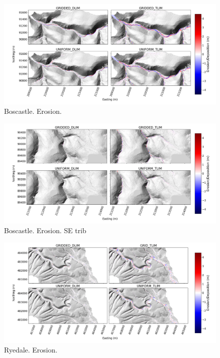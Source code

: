 %
%

\begin{figure}
\includegraphics[width=25cm]{chp06_figures_scripts/figure_boscastle_erosion_diff_ensemble.png}
\caption{Boscastle. Erosion.}
\label{fig_boscastle_2dplan_erosion_ensemble}
\end{figure}

\begin{figure}
\includegraphics[width=18cm]{chp06_figures_scripts/figure_boscastle_erosion_diff_ensemble_SE.png}
\caption{Boscastle. Erosion. SE trib}
\label{fig_boscastle_2dplan_erosion_ensemble_SE}
\end{figure}

\begin{figure}
\includegraphics[width=25cm]{chp06_figures_scripts/figure_ryedale_erosion_diff_ensemble.png}
\caption{Ryedale. Erosion.}
\label{fig_ryedale_2dplan_erosion_ensemble}
\end{figure}

